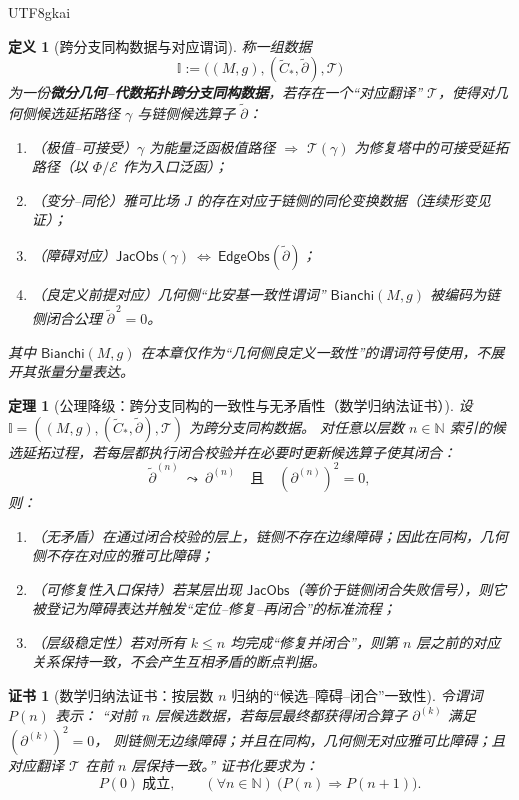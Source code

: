 \documentclass[12pt]{article}
\newtheorem{definition}{定义}[section]
\newtheorem{theorem}{定理}[section]
\newtheorem{Certificate}{证书}[section]
\newcommand{\NN}{\mathbb{N}}
\newcommand{\KouJing}{\texorpdfstring{表述约定}{表述约定}}
\begin{document}
\begin{CJK*}{UTF8}{gkai}
\begin{definition}[跨分支同构数据与对应谓词]
称一组数据
\[
  \mathbb{I}:=\bigl((M,g),(\widetilde{C}_*,\widetilde{\partial}),\mathcal{T}\bigr)
\]
为一份\textbf{微分几何--代数拓扑跨分支同构数据}，若存在一个“对应翻译” $\mathcal{T}$，使得对几何侧候选延拓路径 $\gamma$ 与链侧候选算子 $\widetilde{\partial}$：
\begin{enumerate}
  \item （极值--可接受）$\gamma$ 为能量泛函极值路径 $\Rightarrow$ $\mathcal{T}(\gamma)$ 为修复塔中的可接受延拓路径（以 $\Phi/\mathcal{E}$ 作为入口泛函）；
  \item （变分--同伦）雅可比场 $J$ 的存在对应于链侧的同伦变换数据（连续形变见证）；
  \item （障碍对应）$\mathsf{JacObs}(\gamma)\ \Leftrightarrow\ \mathsf{EdgeObs}(\widetilde{\partial})$；
  \item （良定义前提对应）几何侧“比安基一致性谓词” $\mathsf{Bianchi}(M,g)$ 被编码为链侧闭合公理 $\widetilde{\partial}^{\,2}=0$。
\end{enumerate}
其中 $\mathsf{Bianchi}(M,g)$ 在本章仅作为“几何侧良定义一致性”的谓词符号使用，不展开其张量分量表达。
\end{definition}

\begin{theorem}[公理降级：跨分支同构的一致性与无矛盾性（数学归纳法证书）]
\label{thm:tex29-ch16-isomorphism-consistency}
设 $\mathbb{I}=((M,g),(\widetilde{C}_*,\widetilde{\partial}),\mathcal{T})$ 为跨分支同构数据。
对任意以层数 $n\in\NN$ 索引的候选延拓过程，若每层都执行闭合校验并在必要时更新候选算子使其闭合：
\[
  \widetilde{\partial}^{(n)}\ \leadsto\ \partial^{(n)}\quad\text{且}\quad (\partial^{(n)})^2=0,
\]
则：
\begin{enumerate}
  \item （无矛盾）在通过闭合校验的层上，链侧不存在边缘障碍；因此在同构，几何侧不存在对应的雅可比障碍；
  \item （可修复性入口保持）若某层出现 $\mathsf{JacObs}$（等价于链侧闭合失败信号），则它被登记为障碍表达并触发“定位--修复--再闭合”的标准流程；
  \item （层级稳定性）若对所有 $k\le n$ 均完成“修复并闭合”，则第 $n$ 层之前的对应关系保持一致，不会产生互相矛盾的断点判据。
\end{enumerate}
\end{theorem}

\begin{Certificate}[数学归纳法证书：按层数 $n$ 归纳的“候选--障碍--闭合”一致性]
\label{cert:tex29-ch16-isomorphism-consistency}
令谓词 $P(n)$ 表示：
“对前 $n$ 层候选数据，若每层最终都获得闭合算子 $\partial^{(k)}$ 满足 $(\partial^{(k)})^2=0$，
则链侧无边缘障碍；并且在同构，几何侧无对应雅可比障碍；且对应翻译 $\mathcal{T}$ 在前 $n$ 层保持一致。”
证书化要求为：
\[
  P(0)\ \text{成立},\qquad (\forall n\in\NN)\ \bigl(P(n)\Rightarrow P(n+1)\bigr).
\]
\end{Certificate}


\end{CJK*}
\end{document}
